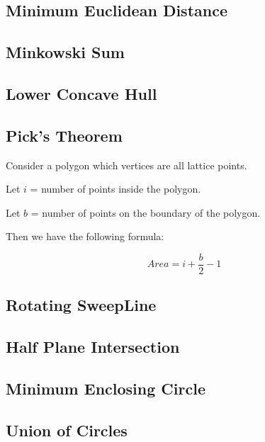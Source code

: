 \documentclass[a4paper,10pt,twocolumn,oneside,x11names]{article}
\begin{document}
\subsection{Minimum Euclidean Distance}


\subsection{Minkowski Sum}


\subsection{Lower Concave Hull}



\subsection{Pick's Theorem}
Consider a polygon which vertices are all lattice points.

Let $i$ = number of points inside the polygon.

Let $b$ = number of points on the boundary of the polygon.

Then we have the following formula:

$$
Area = i + \frac{b}{2} - 1
$$

\subsection{Rotating SweepLine}


\subsection{Half Plane Intersection}


\subsection{Minimum Enclosing Circle}


\subsection{Union of Circles}

\end{document}
